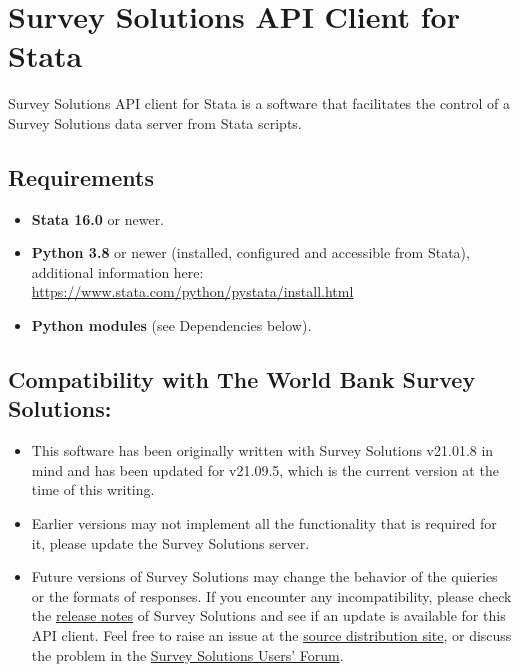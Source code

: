 \section{Survey Solutions API Client for Stata}

\vskip16pt
Survey Solutions API client for Stata is a software that facilitates the
control of a Survey Solutions data server from Stata scripts.

\vskip16pt
\subsection{Requirements}

\begin{itemize}
    \item \textbf{Stata 16.0} or newer.
    \item \textbf{Python 3.8} or newer (installed, configured and accessible
    from Stata), additional information here: \newline
    \href{https://www.stata.com/python/pystata/install.html}{https://www.stata.com/python/pystata/install.html}
    \item \textbf{Python modules} (see Dependencies below).
\end{itemize}

\vskip16pt
\subsection{Compatibility with The World Bank Survey Solutions:}
\begin{itemize}
  \item This software has been originally written with Survey Solutions
        v21.01.8 in mind and has been updated for v21.09.5, which is the
        current version at the time of this writing.
  \item Earlier versions may not implement all the functionality that is
        required for it, please update the Survey Solutions server.
  \item Future versions of Survey Solutions may change the behavior of the
        quieries or the formats of responses. If you encounter any
        incompatibility, please check the
        \href{https://docs.mysurvey.solutions/release_notes}{release notes} of Survey Solutions and see if an update is available for this
        API client. Feel free to raise an issue at the
        \href{https://github.com/radyakin/susoapi}{source distribution
        site}, or discuss the problem in the
        \href{https://forum.mysurvey.solutions}{Survey Solutions Users' Forum}.
\end{itemize}

